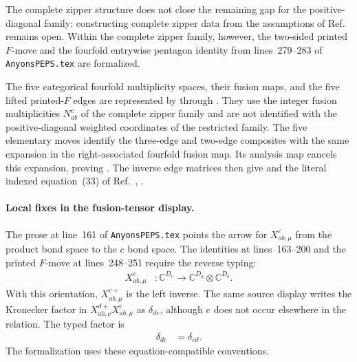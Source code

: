 \documentclass{article}
\begin{document}
The complete zipper structure does not close the remaining gap for the
positive-diagonal family: constructing complete zipper data from the
assumptions of Ref.~\cite{Cirac2016MPDO_arXiv} remains open. Within the
complete zipper family, however, the two-sided printed $F$-move and the
fourfold entrywise pentagon identity from lines~279--283 of
\texttt{AnyonsPEPS.tex} are formalized.

The five categorical fourfold multiplicity spaces, their fusion maps, and the
five lifted printed-$F$ edges are represented by
through
. They use
the integer fusion multiplicities $N_{ab}^{c}$ of the complete zipper family
and are not identified with the positive-diagonal weighted coordinates of the
restricted family. The five elementary moves identify the three-edge and
two-edge composites with the same expansion in the right-associated fourfold
fusion map. Its analysis map cancels this expansion, proving
.
The inverse edge matrices then give
and the literal indexed equation~(33) of Ref.~\cite{Cirac2016MPDO_arXiv},
.

\paragraph{Local fixes in the fusion-tensor display.}

The prose at line~161 of \texttt{AnyonsPEPS.tex} points the arrow for
$X^c_{ab,\mu}$ from the product bond space to the $c$ bond space. The
identities at lines~163--200 and the printed $F$-move at lines~248--251
require the reverse typing:
\begin{align}
    X^c_{ab,\mu}
        &\colon \mathbb C^{D_c}
        \longrightarrow
        \mathbb C^{D_a}\otimes\mathbb C^{D_b}.
\label{eq:cpgsv17_blocked_chi_uniformity_fusion_tensor_orientation}
\end{align}
With this orientation, $X^{c+}_{ab,\mu}$ is the left inverse. The same source
display writes the Kronecker factor in
$X^{d+}_{ab,\nu}X^c_{ab,\mu}$ as $\delta_{de}$, although $e$ does not occur
elsewhere in the relation. The typed factor is
\begin{align}
    \delta_{dc}
        &= \delta_{cd}.
\label{eq:cpgsv17_blocked_chi_uniformity_correct_kronecker_delta}
\end{align}
The formalization uses these equation-compatible conventions.
\end{document}
